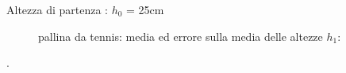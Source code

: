 \documentclass[a4paper]{article}
\theoremstyle{definition}
\begin{document}
	\begin{table}[!ht]
		\centering
		
	\end{table}
	\noindent	Altezza di partenza : \(h_{0}\) = 25cm
			
	\begin{table}[!ht]
		\centering
		
	\end{table}
	
	\begin{figure}[!htbp]
		\captionsetup{labelformat=empty}
			\caption{pallina da tennis: media ed errore sulla media delle altezze \(h_{1}\):}
	\end{figure}
	.\\\\\\\\\\\\\\\\\\\\\\
\end{document}
